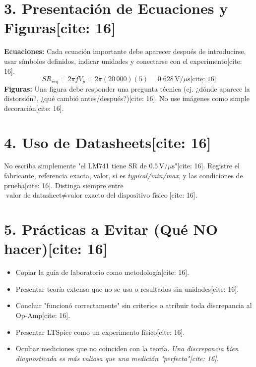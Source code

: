 \documentclass[11pt, a4paper]{article}
\begin{document}
\section*{3. Presentación de Ecuaciones y Figuras[cite: 16]}
\textbf{Ecuaciones:} Cada ecuación importante debe aparecer después de introducirse, usar símbolos definidos, indicar unidades y conectarse con el experimento[cite: 16]. 
\begin{equation*}
    SR_{req} = 2\pi f V_p = 2\pi(20\,000)(5) = 0.628\,\text{V}/\mu\text{s} \text{[cite: 16]}
\end{equation*}
\textbf{Figuras:} Una figura debe responder una pregunta técnica (ej. ¿dónde aparece la distorsión?, ¿qué cambió antes/después?)[cite: 16]. No use imágenes como simple decoración[cite: 16].

\section*{4. Uso de Datasheets[cite: 16]}
No escriba simplemente "el LM741 tiene SR de $0.5\,\text{V}/\mu\text{s}$"[cite: 16]. Registre el fabricante, referencia exacta, valor, si es \textit{typical/min/max}, y las condiciones de prueba[cite: 16]. Distinga siempre entre $\text{valor de datasheet} \neq \text{valor exacto del dispositivo físico}$[cite: 16].

\section*{5. Prácticas a Evitar (Qué NO hacer)[cite: 16]}
\begin{itemize}
    \item Copiar la guía de laboratorio como metodología[cite: 16].
    \item Presentar teoría extensa que no se usa o resultados sin unidades[cite: 16].
    \item Concluir "funcionó correctamente" sin criterios o atribuir toda discrepancia al Op-Amp[cite: 16].
    \item Presentar LTSpice como un experimento físico[cite: 16].
    \item Ocultar mediciones que no coinciden con la teoría. \textit{Una discrepancia bien diagnosticada es más valiosa que una medición "perfecta"[cite: 16].}
\end{itemize}
\end{document}
